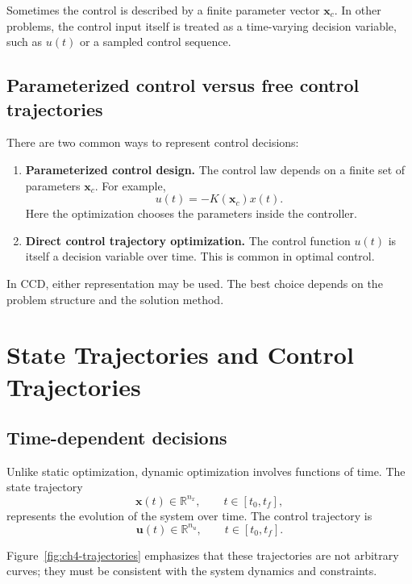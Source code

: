 \documentclass[11pt]{article}
\newcommand{\vect}[1]{\boldsymbol{#1}}
\newcommand{\xc}{\vect{x}_c}
\newcommand{\xstate}{\vect{x}}
\newcommand{\uvec}{\vect{u}}
\newcommand{\R}{\mathbb{R}}
\begin{document}
Sometimes the control is described by a finite parameter vector $\xc$. In other problems, the control input itself is treated as a time-varying decision variable, such as $u(t)$ or a sampled control sequence.

\subsection{Parameterized control versus free control trajectories}

There are two common ways to represent control decisions:
\begin{enumerate}[leftmargin=1.5em]
  \item \textbf{Parameterized control design.} The control law depends on a finite set of parameters $\xc$. For example,
  \begin{equation}
  u(t) = -K(\xc) x(t).
  \end{equation}
  Here the optimization chooses the parameters inside the controller.

  \item \textbf{Direct control trajectory optimization.} The control function $u(t)$ is itself a decision variable over time. This is common in optimal control.
\end{enumerate}

In CCD, either representation may be used. The best choice depends on the problem structure and the solution method.

\section{State Trajectories and Control Trajectories}

\subsection{Time-dependent decisions}

Unlike static optimization, dynamic optimization involves functions of time. The state trajectory
\begin{equation}
\xstate(t) \in \R^{n_x}, \qquad t \in [t_0,t_f],
\end{equation}
represents the evolution of the system over time. The control trajectory is
\begin{equation}
\uvec(t) \in \R^{n_u}, \qquad t \in [t_0,t_f].
\end{equation}

Figure~\ref{fig:ch4-trajectories} emphasizes that these trajectories are not arbitrary curves; they must be consistent with the system dynamics and constraints.
\end{document}
